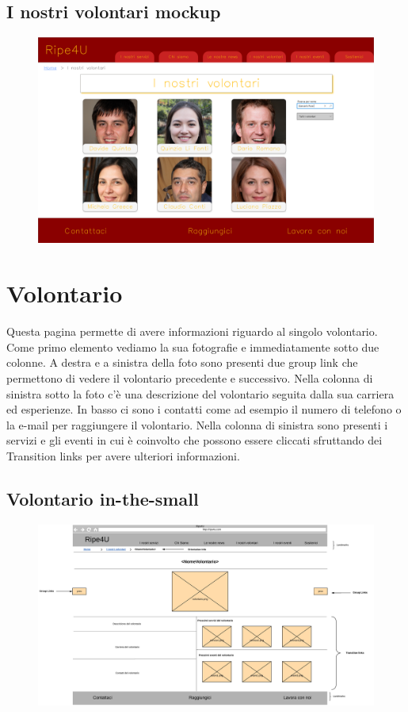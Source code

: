         \subsection{I nostri volontari mockup}
        \begin{figure}[H]
            \centering
            \includegraphics[scale=0.18]{resources/images/iNostriVolontari-mockup.png}
        \end{figure}

    \section{Volontario}
    Questa pagina permette di avere informazioni riguardo al singolo volontario.
    Come primo elemento vediamo la sua fotografie e immediatamente sotto due
    colonne. A destra e a sinistra della foto sono presenti due group link che
    permettono di vedere il volontario precedente e successivo. Nella colonna di
    sinistra sotto la foto c'è una descrizione del volontario seguita dalla sua
    carriera ed esperienze. In basso ci sono i contatti come ad esempio il
    numero di telefono o la e-mail per raggiungere il volontario. Nella colonna
    di sinistra sono presenti i servizi e gli eventi in cui è coinvolto che
    possono essere cliccati sfruttando dei Transition links per avere ulteriori
    informazioni.

        \subsection{Volontario in-the-small}
        \begin{figure}[H]
            \centering
            \includegraphics[scale=0.35]{resources/images/volontario-in-the-small.jpg}
        \end{figure}

